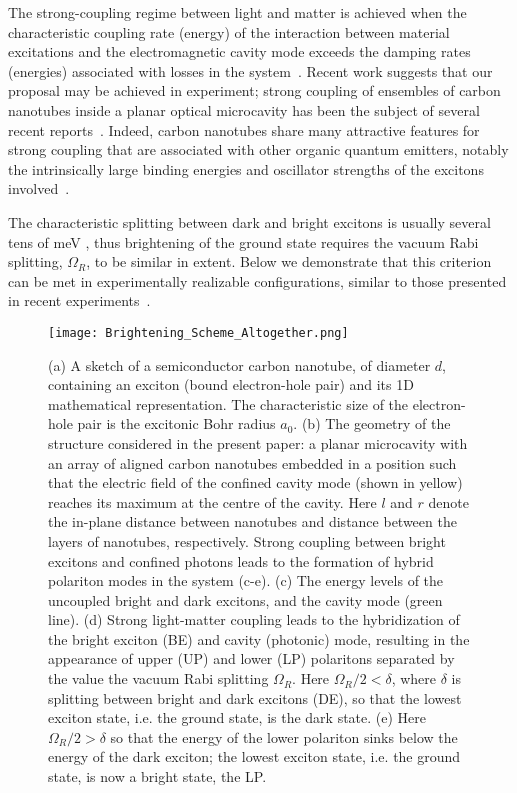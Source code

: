 \documentclass[journal=aamick,manuscript=article]{achemso}
\begin{document}
The strong-coupling regime between light and matter is achieved when the characteristic coupling rate (energy) of the interaction between material excitations and the electromagnetic cavity mode exceeds the damping rates (energies) associated with losses in the system~\cite{Microcavities}.
Recent work suggests that our proposal may be achieved in experiment; strong coupling of ensembles of carbon nanotubes inside a planar optical microcavity has been the subject of several recent reports~\cite{Graf2016,Zakharko2016,Graf2017,Gao2018}. Indeed, carbon nanotubes share many attractive features for strong coupling that are associated with other organic quantum emitters, notably the intrinsically large binding energies and oscillator strengths of the excitons involved~\cite{KCohen2010,KCohen2013,KCohen2014,Plumhof2014}.

The characteristic splitting between dark and bright excitons is usually several tens of meV \cite{Spataru2005}, thus brightening of the ground state requires the vacuum Rabi splitting, $\Omega_R$, to be similar in extent.
Below we demonstrate that this criterion can be met in experimentally realizable configurations, similar to those presented in recent experiments~\cite{Graf2016,Zakharko2016,Graf2017}.\\


\begin{figure}
  \centering
  \texttt{[image: Brightening\_Scheme\_Altogether.png]}
  \caption{(a) A sketch of a semiconductor carbon nanotube, of diameter $d$, containing an exciton (bound electron-hole pair) and its 1D mathematical representation.
The characteristic size of the electron-hole pair is the excitonic Bohr radius $a_0$.
(b) The geometry of the structure considered in the present paper: a planar microcavity with an array of aligned carbon nanotubes embedded in a position such that the electric field of the confined cavity mode (shown in yellow) reaches its maximum at the centre of the cavity. Here $l$ and $r$ denote the in-plane distance between nanotubes and distance between the layers of nanotubes, respectively.
Strong coupling between bright excitons and confined photons leads to the formation of hybrid polariton modes in the system (c-e).
(c) The energy levels of the uncoupled bright and dark excitons, and the cavity mode (green line).
(d) Strong light-matter coupling leads to the hybridization of the bright exciton (BE) and cavity (photonic) mode, resulting in the appearance of upper (UP) and lower (LP) polaritons separated by the value the vacuum Rabi splitting $\Omega_R$. Here $\Omega_R/2<\delta$, where $\delta$ is splitting between bright and dark excitons (DE), so that the lowest exciton state, i.e. the ground state, is the dark state.
(e) Here $\Omega_R/2>\delta$ so that the energy of the lower polariton sinks below the energy of the dark exciton; the lowest exciton state, i.e. the ground state, is now a bright state, the LP.}
\label{sketch}
\end{figure}
%
\end{document}
